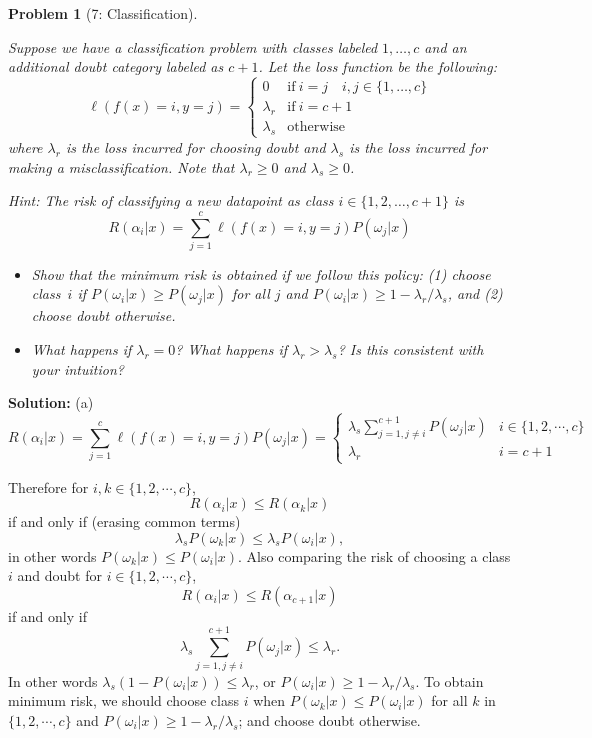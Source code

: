\documentclass[11pt]{exam}
\theoremstyle{quest}
\newtheorem*{question}{Problem}
\begin{document}
\newpage


\begin{question}[7: Classification]
~

Suppose we have a classification problem with classes labeled $1, \dotsc, c$ and
an additional doubt category labeled as $c+1$. Let the loss function be the
following:\\
\[
\ell(f(x) = i, y = j) =
  \begin{cases}
   0 &  \mathrm{if}\ i=j \quad i,j\in\{1,\dotsc,c\} \\
   \lambda_r       & \mathrm{if}\ i=c+1 \\
   \lambda_s       & \text{otherwise}
  \end{cases}
\]
where $\lambda_r$ is the loss incurred for choosing doubt and $\lambda_s$ is the
loss incurred for making a misclassification. Note that $\lambda_r \ge 0$ and
$\lambda_s \ge 0$.

Hint: The risk of classifying a new datapoint as class $i\in\{1,2,\dots,c+1\}$
is $$R(\alpha_i|x) = \sum_{j=1}^{c} \ell(f(x) = i, y = j) P(\omega_j|x)$$

\begin{itemize}
\item[(a)] Show that the minimum risk is obtained if we follow this policy: (1)
  choose class~$i$ if $P(\omega_i|x) \geq P(\omega_j|x)$ for all $j$ and
  $P(\omega_i|x) \geq 1-\lambda_r/\lambda_s$, and (2) choose doubt otherwise.
\item[(b)] What happens if $\lambda_r=0$? What happens if $\lambda_r>\lambda_s$? Is this consistent with your intuition?
\end{itemize}
\end{question}
\textbf{Solution:}
(a)
\[
R(\alpha_i|x) = \sum_{j=1}^{c} \ell(f(x) = i, y = j) P(\omega_j|x) = 
\begin{cases} 
\lambda_s \sum_{j=1, j \neq i}^{c+1} P(\omega_j | x)&  i \in \{1,2,\cdots, c \} \\
 \lambda_r & i = c+1
\end{cases}
\]

Therefore for $i,k \in \{1,2, \cdots, c \}$, 
\[
R(\alpha_i|x) \leq R(\alpha_k|x)
\]
 if and only if  (erasing common terms)
 \[ 
 \lambda_s P(\omega_k|x) \leq \lambda_s P(\omega_i|x),
 \]
 in other words $P(\omega_k|x) \leq P(\omega_i|x)$. Also comparing the risk of choosing a class $i$ and doubt 
for $i \in \{1,2, \cdots,c\}$, 
\[
R(\alpha_i|x) \leq R(\alpha_{c+1}|x)
\] 
if and only if 
\[
\lambda_s \sum_{j=1, j \neq i}^{c+1} P(\omega_j | x) \leq \lambda_r.
\] In other words $\lambda_s (1- P(\omega_{i}|x)) \leq \lambda_r $, or $P(\omega_i|x) \geq 1-\lambda_r/\lambda_s$. To obtain minimum risk, we should choose class $i$ when $P(\omega_k|x) \leq P(\omega_i|x)$ for all $k$ in $\{1,2, \cdots, c\}$ and $P(\omega_i|x) \geq 1-\lambda_r/\lambda_s$; and choose doubt otherwise.
\end{document}
